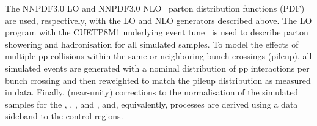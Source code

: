 
The \textsc{NNPDF}3.0 LO and \textsc{NNPDF}3.0 NLO~\cite{nnpdf} parton
distribution functions (PDF) are used, respectively, with the LO and
NLO generators described above. The LO \PYTHIA program with the {\sc
  CUETP8M1} underlying event tune~\cite{Khachatryan:2015pea} is used
to describe parton showering and hadronisation for all simulated
samples. To model the effects of multiple pp collisions within the
same or neighboring bunch crossings (pileup), all simulated events are
generated with a nominal distribution of pp interactions per bunch
crossing and then reweighted to match the pileup distribution as
measured in data. Finally, (near-unity) corrections to the
normalisation of the simulated samples for the \gj, \wmj, \ttbar, and
\zmumuj, and, equivalently, \znunuj processes are derived using a data
sideband to the control regions.

